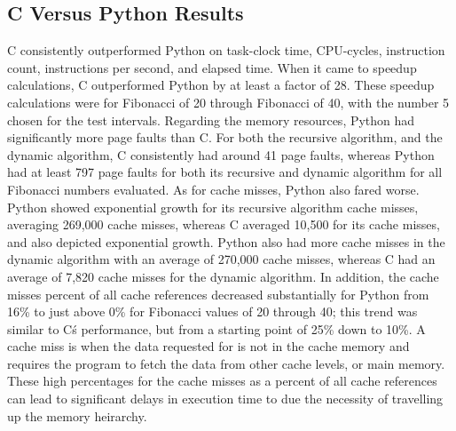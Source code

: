\documentclass{sig-alternate}
\begin{document}
\subsection{C Versus Python Results}
C consistently outperformed Python on task-clock time, CPU-cycles, instruction count, instructions per second, and elapsed time. When it came to speedup calculations, C outperformed Python by at least a factor of 28. These speedup calculations were for Fibonacci of 20 through Fibonacci of 40, with the number 5 chosen for the test intervals. Regarding the memory resources, Python had significantly more page faults than C. For both the recursive algorithm, and the dynamic algorithm, C consistently had around 41 page faults, whereas Python had at least 797 page faults for both its recursive and dynamic algorithm for all Fibonacci numbers evaluated. As for cache misses, Python also fared worse. Python showed exponential growth for its recursive algorithm cache misses, averaging 269,000 cache misses, whereas C averaged 10,500 for its cache misses, and also depicted exponential growth. Python also had more cache misses in the dynamic algorithm with an average of 270,000 cache misses, whereas C had an average of 7,820 cache misses for the dynamic algorithm. In addition, the cache misses percent of all cache references decreased substantially for Python from 16\% to just above 0\% for Fibonacci values of 20 through 40; this trend was similar to C\'s performance, but from a starting point of 25\% down to 10\%. A cache miss is when the data requested for is not in the cache memory and requires the program to fetch the data from other cache levels, or main memory. These high percentages for the cache misses as a percent of all cache references can lead to significant delays in execution time to due the necessity of travelling up the memory heirarchy.
\end{document}
